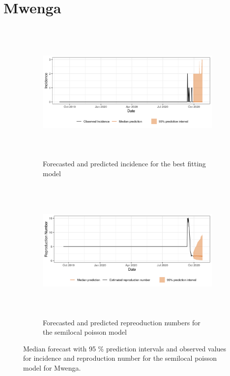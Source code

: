  \section{ Mwenga }\begin{figure}[H]\begin{subfigure}{\textwidth}  \centering  \includegraphics[width=0.9\linewidth, height=7cm]{../output/Mwenga_predictions.png}  \caption{Forecasted and predicted incidence for the best fitting model}\end{subfigure}

\begin{subfigure}{\textwidth}  \centering  \includegraphics[width=0.9\linewidth, height=7cm]{../output/Mwenga_Rs.png}  \caption{Forecasted and predicted repreoduction numbers for the semilocal poisson model}\end{subfigure}  \caption{Median forecast with 95 \% prediction intervals and observed values for incidence and reproduction number for the semilocal poisson model for Mwenga.}\end{figure}

